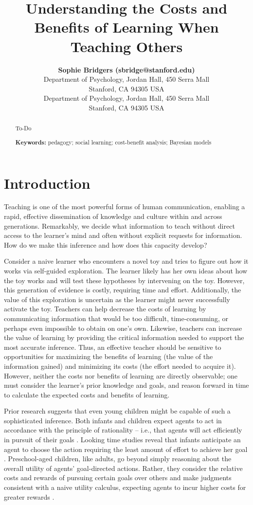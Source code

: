 \documentclass[10pt,letterpaper]{article}
\title{Understanding the Costs and Benefits of Learning When Teaching Others}
\author{{\large \bf Sophie Bridgers (sbridge@stanford.edu)} \\
  Department of Psychology, Jordan Hall, 450 Serra Mall \\
 Stanford, CA 94305 USA
  \AND {\large \bf Emily Tang (emjtang@stanford.edu)} \\
   Department of Psychology, Jordan Hall, 450 Serra Mall \\
 Stanford, CA 94305 USA}
\begin{document}
\maketitle


\begin{abstract}
To-Do

\textbf{Keywords:} 
pedagogy; social learning; cost-benefit analysis; Bayesian models
\end{abstract}


\section{Introduction}

Teaching is one of the most powerful forms of human communication, enabling a rapid, effective dissemination of knowledge and culture within and across generations. Remarkably, we decide what information to teach without direct access to the learner's mind and often without explicit requests for information. How do we make this inference and how does this capacity develop? 

Consider a naive learner who encounters a novel toy and tries to figure out how it works via self-guided exploration. The learner likely has her own ideas about how the toy works and will test these hypotheses by intervening on the toy. However, this generation of evidence is costly, requiring time and effort. Additionally, the value of this exploration is uncertain as the learner might never successfully activate the toy. Teachers can help decrease the costs of learning by communicating information that would be too difficult, time-consuming, or perhaps even impossible to obtain on one's own. Likewise, teachers can increase the value of learning by providing the critical information needed to support the most accurate inference. Thus, an effective teacher should be sensitive to opportunities for maximizing the benefits of learning (the value of the information gained) and minimizing its costs (the effort needed to acquire it). However, neither the costs nor benefits of learning are directly observable; one must consider the learner's prior knowledge and goals, and reason forward in time to calculate the expected costs and benefits of learning.

Prior research suggests that even young children might be capable of such a sophisticated inference. Both infants and children expect agents to act in accordance with the principle of rationality -- i.e., that agents will act efficiently in pursuit of their goals \cite{Baker2009}. 
Looking time studies reveal that infants anticipate an agent to choose the action requiring the least amount of effort to achieve her goal \cite{Scott2013}.
Preschool-aged children, like adults, go beyond simply reasoning about the overall utility of agents' goal-directed actions. 
Rather, they consider the relative costs and rewards of pursuing certain goals over others and make judgments consistent with a naive utility calculus, expecting agents to incur higher costs for greater rewards \cite{JaraEttinger2015}.
\end{document}
